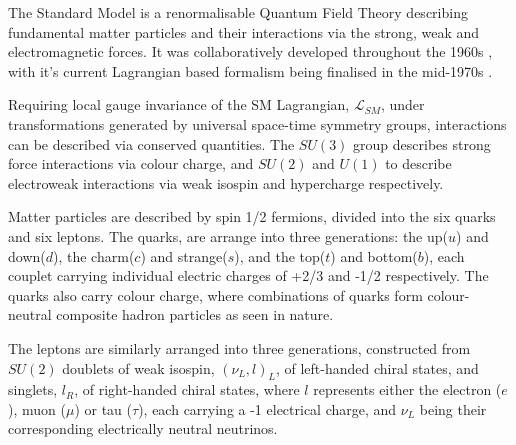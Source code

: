The Standard Model is a renormalisable Quantum Field Theory describing
fundamental matter particles and their interactions via the strong,
weak and electromagnetic forces. It was collaboratively developed throughout the
1960s \cite
{Glashow1961579,PhysRevLett.19.1264,Salam:1968rm,PhysRevLett.30.1346,PhysRevLett.30.1343}, with it's current Lagrangian
based formalism being finalised in the mid-1970s \cite{martinAndShaw}.

Requiring local gauge invariance of the SM Lagrangian, $\mathcal{L}_{SM}$,
under
transformations generated by universal space-time symmetry groups,
interactions can be described via conserved quantities. The $SU(3)$ group
describes strong force interactions via colour charge, and $SU(2)$ and $U(1)$ to
describe electroweak interactions via weak isospin and hypercharge respectively.


Matter particles are described by spin 1/2 fermions, divided into the six quarks
and six leptons. The quarks, are arrange into three generations: the up($u$) and
down($d$), the charm($c$) and strange($s$), and the top($t$) and bottom($b$),
each couplet carrying
individual electric charges of +2/3 and -1/2 respectively. The quarks also carry
colour charge, where combinations of quarks form colour-neutral composite
hadron particles as seen in nature.


The leptons are similarly arranged into three generations, constructed from
$SU(2)$
doublets of weak isospin, $(\nu_L, l)_L$, of left-handed chiral states, and
singlets, $l_R$, of right-handed chiral states, where $l$ represents either the
electron ($e$), muon ($\mu$) or tau ($\tau$), each carrying a -1 electrical
charge, and $\nu_L$ being their corresponding electrically neutral neutrinos.



